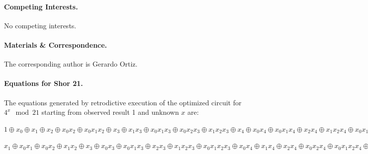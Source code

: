 \documentclass[aps,prl,twocolumn,superscriptaddress,floatfix,notitlepage]{revtex4-2}
\begin{document}
\paragraph*{Competing Interests.}
No competing interests.

\paragraph*{Materials \& Correspondence.}
The corresponding author is Gerardo Ortiz. 

\onecolumngrid
\bigskip

\paragraph*{Equations for Shor 21.}
\label{par:shor21}

The equations generated by retrodictive execution of the optimized
circuit for $4^x \mod{21}$ starting from observed result 1 and unknown
$x$ are:

\bigskip

$1 \oplus x_0 \oplus x_1 \oplus x_2 \oplus x_0x_2 \oplus x_0x_1x_2
\oplus x_3 \oplus x_1x_3 \oplus x_0x_1x_3 \oplus x_0x_2x_3 \oplus
x_1x_2x_3 \oplus x_4 \oplus x_0x_4 \oplus x_0x_1x_4 \oplus x_2x_4
\oplus x_1x_2x_4 \oplus x_0x_1x_2x_4 \oplus x_0x_3x_4 \oplus x_1x_3x_4
\oplus x_2x_3x_4 \oplus x_0x_2x_3x_4 \oplus x_0x_1x_2x_3x_4 \oplus x_5
\oplus x_1x_5 \oplus x_0x_1x_5 \oplus x_0x_2x_5 \oplus x_1x_2x_5
\oplus x_3x_5 \oplus x_0x_3x_5 \oplus x_0x_1x_3x_5 \oplus x_2x_3x_5
\oplus x_1x_2x_3x_5 \oplus x_0x_1x_2x_3x_5 \oplus x_0x_4x_5 \oplus
x_1x_4x_5 \oplus x_2x_4x_5 \oplus x_0x_2x_4x_5 \oplus x_0x_1x_2x_4x_5
\oplus x_3x_4x_5 \oplus x_1x_3x_4x_5 \oplus x_0x_1x_3x_4x_5 \oplus
x_0x_2x_3x_4x_5 \oplus x_1x_2x_3x_4x_5 = 1$

\bigskip

$x_1 \oplus x_0x_1 \oplus x_0x_2 \oplus x_1x_2 \oplus x_3 \oplus
x_0x_3 \oplus x_0x_1x_3 \oplus x_2x_3 \oplus x_1x_2x_3 \oplus
x_0x_1x_2x_3 \oplus x_0x_4 \oplus x_1x_4 \oplus x_2x_4 \oplus
x_0x_2x_4 \oplus x_0x_1x_2x_4 \oplus x_3x_4 \oplus x_1x_3x_4 \oplus
x_0x_1x_3x_4 \oplus x_0x_2x_3x_4 \oplus x_1x_2x_3x_4 \oplus x_5 \oplus
x_0x_5 \oplus x_0x_1x_5 \oplus x_2x_5 \oplus x_1x_2x_5 \oplus
x_0x_1x_2x_5 \oplus x_0x_3x_5 \oplus x_1x_3x_5 \oplus x_2x_3x_5 \oplus
x_0x_2x_3x_5 \oplus x_0x_1x_2x_3x_5 \oplus x_4x_5 \oplus x_1x_4x_5
\oplus x_0x_1x_4x_5 \oplus x_0x_2x_4x_5 \oplus x_1x_2x_4x_5 \oplus
x_3x_4x_5 \oplus x_0x_3x_4x_5 \oplus x_0x_1x_3x_4x_5 \oplus
x_2x_3x_4x_5 \oplus x_1x_2x_3x_4x_5 \oplus x_0x_1x_2x_3x_4x_5 = 0$
\end{document}
